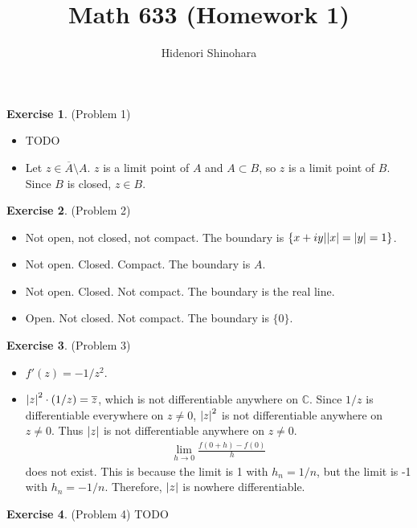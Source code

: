 \documentclass[12pt, psamsfonts]{amsart}
\theoremstyle{definition}
\newtheorem*{exer}{Exercise}
\theoremstyle{remark}
\numberwithin{equation}{section}
\begin{document}
\title{Math 633 (Homework 1)}
\author{Hidenori Shinohara}
\maketitle

\begin{exer}{(Problem 1)}
  \begin{itemize}
    \item
      TODO
    \item
      Let $z \in \overline{A} \setminus A$.
      $z$ is a limit point of $A$ and $A \subset B$, so $z$ is a limit point of $B$.
      Since $B$ is closed, $z \in B$.
  \end{itemize}
\end{exer}

\begin{exer}{(Problem 2)}
 \begin{itemize}
   \item
     Not open, not closed, not compact. The boundary is $\{ x + iy | \abs{x} = \abs{y} = 1 \}$.
   \item
     Not open. Closed. Compact. The boundary is $A$.
   \item
     Not open. Closed. Not compact. The boundary is the real line.
   \item
     Open. Not closed. Not compact. The boundary is $\{ 0 \}$.
 \end{itemize}
\end{exer}

\begin{exer}{(Problem 3)}
 \begin{itemize}
   \item
     $f'(z) = -1/z^2$.
   \item
     $\abs{z}^2 \cdot (1/z) = \overline{z}$, which is not differentiable anywhere on $\mathbb{C}$.
     Since $1 / z$ is differentiable everywhere on $z \ne 0$, $\abs{z}^2$ is not differentiable anywhere on $z \ne 0$.
     Thus $\abs{z}$ is not differentiable anywhere on $z \ne 0$.
     \begin{align*}
        \lim_{h \rightarrow 0} \frac{f(0 + h) - f(0)}{h}
     \end{align*}
     does not exist.
     This is because the limit is 1 with $h_n = 1 / n$, but the limit is -1 with $h_n = -1/n$.
     Therefore, $\abs{z}$ is nowhere differentiable.
 \end{itemize}
\end{exer}

\begin{exer}{(Problem 4)}
  TODO
\end{exer}
\end{document}
